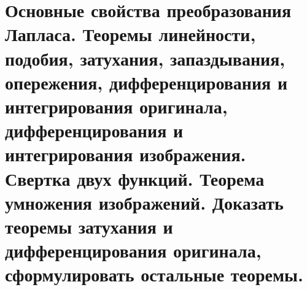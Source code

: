\newpage
\section{Основные свойства преобразования Лапласа. Теоремы линейности, подобия, затухания, запаздывания, опережения, дифференцирования и интегрирования оригинала, дифференцирования и интегрирования изображения. Свертка двух функций. Теорема умножения изображений. Доказать теоремы затухания и дифференцирования оригинала, сформулировать остальные теоремы.}

